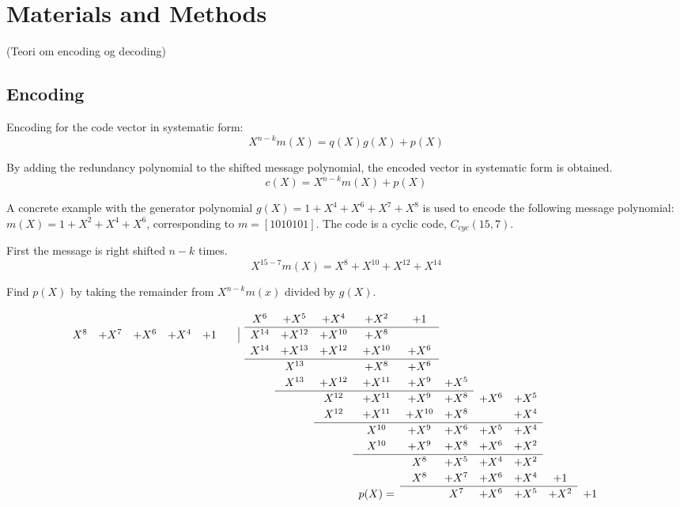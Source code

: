 \documentclass[Main]{subfiles}
\begin{document}
\section{Materials and Methods}

(Teori om encoding og decoding)
\subsection{Encoding}

\noindent Encoding for the code vector in systematic form:
\begin{equation}
X^{n-k}m(X) = q(X)g(X)+p(X)
\end{equation}

\noindent By adding the redundancy polynomial to the shifted message polynomial, the encoded vector in systematic form is obtained.
\begin{equation}
c(X) = X^{n-k}m(X)+p(X)
\end{equation}

\noindent A concrete example with the generator polynomial $g(X)=1+X^4+X^6+X^7+X^8$ is used to encode the following message polynomial:
$m(X)=1+X^2+X^4+X^6$, corresponding to $m=[1010101]$. The code is a cyclic code, $C_{cyc}(15,7)$.

\noindent First the message is right shifted $n-k$ times.
\begin{equation}
X^{15-7}m(X) = X^8+X^{10}+X^{12}+X^{14}
\end{equation}

\noindent Find $p(X)$ by taking the remainder from $X^{n-k}m(x)$ divided by $g(X)$.


\[
\renewcommand\arraystretch{1.2}
\begin{array}{cccccccccccccccccc}
& & & & & X^6 & + X^5 &  +X^4 & +X^2 & +1 & & & & & & & \\
\cline{6-10}
 X^8 & + X^7 & +X^6 & +X^4 & +1 \qquad \vline & X^{14} & +X^{12} & +X^{10} & + X^8 & & & & & & & & \\
& & & & & X^{14} & + X^{13}& + X^{12} & +X^{10} & +X^6 & & & & & & & \\
\cline{6-10}
& & & & & & X^{13} & & +X^8 & +X^6 & & & & & & &\\
&  &&    &&    &  X^{13} & +X^{12} & +X^{11} & +X^9 & +X^5 & \\
\cline{7-11}
& & &&  &&    &  X^{12} & +X^{11} & +X^9 & +X^8 & +X^6 & +X^5  \\
& & &&  &&    &  X^{12} & +X^{11} & +X^{10} & +X^8 & & +X^4  \\
\cline{8-13}
&  &&    &    &   & &  & X^{10} & +X^9 & +X^6 & +X^5 & +X^4 \\
&  &&    &    &   & &  & X^{10} & +X^9 & +X^8 & +X^6 & +X^2 \\
\cline{9-13}
&  &&    &    &   & & & & X^{8} & +X^5 & +X^4 & +X^2 \\
&  &&    &    &   & & & & X^{8} & +X^7 & +X^6 & +X^4 & +1 \\
\cline{10-14}
&  &&  & & & & & p(X) = & & X^{7} & +X^6 & +X^5 & +X^2 & +1 \\
\end{array}
\]
\end{document}

